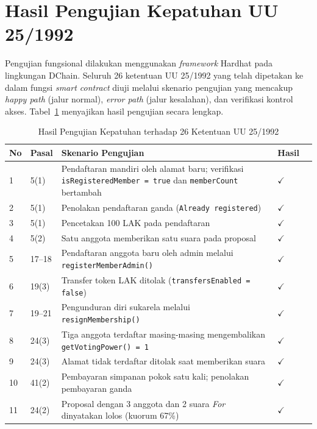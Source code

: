 \section{Hasil Pengujian Kepatuhan UU 25/1992}

Pengujian fungsional dilakukan menggunakan \textit{framework} Hardhat pada lingkungan DChain. Seluruh 26 ketentuan UU 25/1992 yang telah dipetakan ke dalam fungsi \textit{smart contract} diuji melalui skenario pengujian yang mencakup \textit{happy path} (jalur normal), \textit{error path} (jalur kesalahan), dan verifikasi kontrol akses. Tabel~\ref{tab:compliance-results} menyajikan hasil pengujian secara lengkap.

\begin{table}[H]
\centering
\caption{Hasil Pengujian Kepatuhan terhadap 26 Ketentuan UU 25/1992}
\label{tab:compliance-results}
\scriptsize
\begin{tabular}{p{}p{}p{}p{}p{}}
\toprule
\textbf{No} & \textbf{Pasal} & \textbf{Skenario Pengujian} & \textbf{Hasil} \\
\midrule
1 & 5(1) & Pendaftaran mandiri oleh alamat baru; verifikasi \texttt{isRegisteredMember = true} dan \texttt{memberCount} bertambah & $\checkmark$ \\
2 & 5(1) & Penolakan pendaftaran ganda (\texttt{Already registered}) & $\checkmark$ \\
3 & 5(1) & Pencetakan 100 LAK pada pendaftaran & $\checkmark$ \\
4 & 5(2) & Satu anggota memberikan satu suara pada proposal & $\checkmark$ \\
5 & 17--18 & Pendaftaran anggota baru oleh admin melalui \texttt{registerMemberAdmin()} & $\checkmark$ \\
6 & 19(3) & Transfer token LAK ditolak (\texttt{transfersEnabled = false}) & $\checkmark$ \\
7 & 19--21 & Pengunduran diri sukarela melalui \texttt{resignMembership()} & $\checkmark$ \\
8 & 24(3) & Tiga anggota terdaftar masing-masing mengembalikan \texttt{getVotingPower() = 1} & $\checkmark$ \\
9 & 24(3) & Alamat tidak terdaftar ditolak saat memberikan suara & $\checkmark$ \\
10 & 41(2) & Pembayaran simpanan pokok satu kali; penolakan pembayaran ganda & $\checkmark$ \\
11 & 24(2) & Proposal dengan 3 anggota dan 2 suara \textit{For} dinyatakan lolos (kuorum 67\%) & $\checkmark$ \\

\end{tabular}
\end{table}
